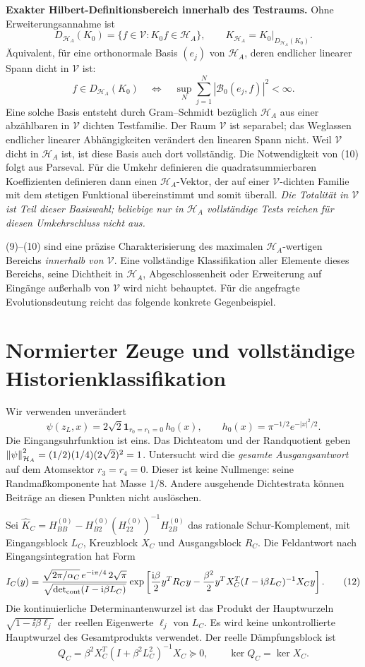 \documentclass[10pt,a4paper]{article}
\newcommand{\HH}{\mathcal H_A}\newcommand{\VV}{\mathcal V}
\newcommand{\one}{\mathbf1}\newcommand{\Ccal}{\mathcal C_{33}}
\begin{document}
\textbf{Exakter Hilbert-Definitionsbereich innerhalb des Testraums.}
Ohne Erweiterungsannahme ist
\[
 D_{\HH}(K_0)=\{f\in\VV:K_0f\in\HH\},\qquad
 K_{\HH}=K_0|_{D_{\HH}(K_0)}. \tag{9}
\]
Äquivalent, für eine orthonormale Basis $(e_j)$ von $\HH$, deren endlicher
linearer Spann dicht in $\VV$ ist:
\[
 f\in D_{\HH}(K_0)\quad\Longleftrightarrow\quad
 \sup_N\sum_{j=1}^N|\mathcal B_0(e_j,f)|^2<\infty. \tag{10}
\]
Eine solche Basis entsteht durch Gram--Schmidt bezüglich $\HH$ aus einer
abzählbaren in $\VV$ dichten Testfamilie. Der Raum $\VV$ ist separabel;
das Weglassen endlicher linearer Abhängigkeiten verändert den linearen Spann
nicht. Weil $\VV$ dicht in $\HH$ ist, ist diese Basis auch dort vollständig.
Die Notwendigkeit von (10) folgt aus Parseval. Für die Umkehr definieren die
quadratsummierbaren
Koeffizienten definieren dann einen $\HH$-Vektor, der auf einer $\VV$-dichten
Familie mit dem stetigen Funktional übereinstimmt und somit überall.
\emph{Die Totalität in $\VV$ ist Teil dieser Basiswahl; beliebige nur in $\HH$
vollständige Tests reichen für diesen Umkehrschluss nicht aus.}

(9)--(10) sind eine präzise Charakterisierung des maximalen $\HH$-wertigen
Bereichs \emph{innerhalb von $\VV$}. Eine vollständige Klassifikation aller
Elemente dieses Bereichs, seine Dichtheit in $\HH$, Abgeschlossenheit oder
Erweiterung auf Eingänge außerhalb von $\VV$ wird nicht behauptet.
Für die angefragte Evolutionsdeutung reicht das folgende konkrete Gegenbeispiel.

\section{Normierter Zeuge und vollständige Historienklassifikation}
Wir verwenden unverändert
\[
 \psi(z_L,x)=2\sqrt2\one_{r_0=r_1=0}\,h_0(x),\qquad
 h_0(x)=\pi^{-1/2}e^{-|x|^2/2}.
 \tag{11}
\]
Die Eingangsuhrfunktion ist eins. Das Dichteatom und der Randquotient geben
$\norm\psi_{\HH}^2=(1/2)(1/4)(2\sqrt2)^2=1$.
Untersucht wird die \emph{gesamte Ausgangsantwort} auf dem Atomsektor
$r_3=r_4=0$. Dieser ist keine Nullmenge: seine Randmaßkomponente hat Masse $1/8$.
Andere ausgehende Dichtestrata können Beiträge an diesen Punkten nicht auslöschen.

Sei $\widehat K_C=H_{BB}^{(0)}-H_{B2}^{(0)}(H_{22}^{(0)})^{-1}H_{2B}^{(0)}$
das rationale Schur-Komplement, mit Eingangsblock $L_C$, Kreuzblock $X_C$
und Ausgangsblock $R_C$. Die Feldantwort nach Eingangsintegration hat Form
\[
 I_C(y)=\frac{\sqrt{2\pi/\alpha_C}\,e^{-\mathrm i\pi/4}\,2\sqrt\pi}
                 {\sqrt{\det_{\rm cont}(I-\mathrm i\beta L_C)}}
 \exp\left[\frac{\mathrm i\beta}2y^TR_Cy-
 \frac{\beta^2}2y^TX_C^T(I-\mathrm i\beta L_C)^{-1}X_Cy\right]. \tag{12}
\]
Die kontinuierliche Determinantenwurzel ist das Produkt der Hauptwurzeln
$\sqrt{1-\ii\beta\ell_j}$ der reellen Eigenwerte $\ell_j$ von $L_C$.
Es wird keine unkontrollierte Hauptwurzel des Gesamtprodukts verwendet.
Der reelle Dämpfungsblock ist
\[
 Q_C=\beta^2 X_C^T(I+\beta^2L_C^2)^{-1}X_C\succeq0,
 \qquad\ker Q_C=\ker X_C. \tag{13}
\]
\newpage
\end{document}
